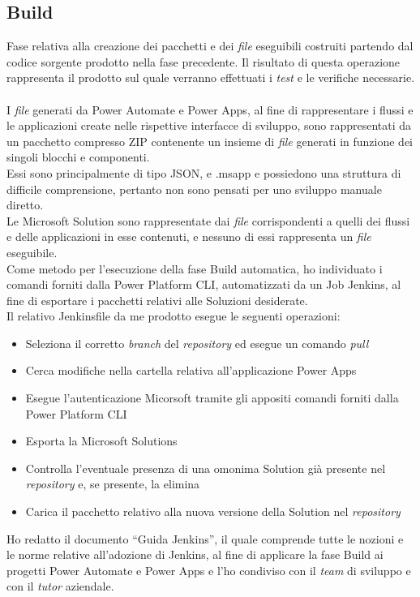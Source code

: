 \subsection{Build}
Fase relativa alla creazione dei pacchetti e dei \emph{file} eseguibili costruiti partendo dal codice sorgente prodotto nella fase precedente.
Il risultato di questa operazione rappresenta il prodotto sul quale verranno effettuati i \emph{test} e le verifiche necessarie.\\\\
I \emph{file} generati da Power Automate e Power Apps, al fine di rappresentare i flussi e le applicazioni create nelle rispettive interfacce di sviluppo, sono rappresentati da un pacchetto compresso ZIP contenente un insieme di \emph{file} generati in funzione dei singoli blocchi e componenti.\\
Essi sono principalmente di tipo JSON, e .msapp e possiedono una struttura di difficile comprensione, pertanto non sono pensati per uno sviluppo manuale diretto.\\
Le Microsoft Solution sono rappresentate dai \emph{file} corrispondenti a quelli dei flussi e delle applicazioni in esse contenuti, e nessuno di essi rappresenta un \emph{file} eseguibile.\\
Come metodo per l'esecuzione della fase Build automatica, ho individuato i comandi forniti dalla Power Platform CLI, automatizzati da un Job Jenkins, al fine di esportare i pacchetti relativi alle Soluzioni desiderate.\\
Il relativo Jenkinsfile da me prodotto esegue le seguenti operazioni:
\begin{itemize}
    \item Seleziona il corretto \emph{branch} del \emph{repository} ed esegue un comando \emph{pull}
    \item Cerca modifiche nella cartella relativa all'applicazione Power Apps
    \item Esegue l'autenticazione Micorsoft tramite gli appositi comandi forniti dalla Power Platform CLI
    \item Esporta la Microsoft Solutions
    \item Controlla l'eventuale presenza di una omonima Solution già presente nel \emph{repository} e, se presente, la elimina 
    \item Carica il pacchetto relativo alla nuova versione della Solution nel \emph{repository}
\end{itemize}
Ho redatto il documento “Guida Jenkins”, il quale comprende tutte le nozioni e le norme relative all'adozione di Jenkins, al fine di applicare la fase Build ai progetti Power Automate e Power Apps e l'ho condiviso con il \emph{team} di sviluppo e con il \emph{\emph{tutor}} aziendale.\\\\


